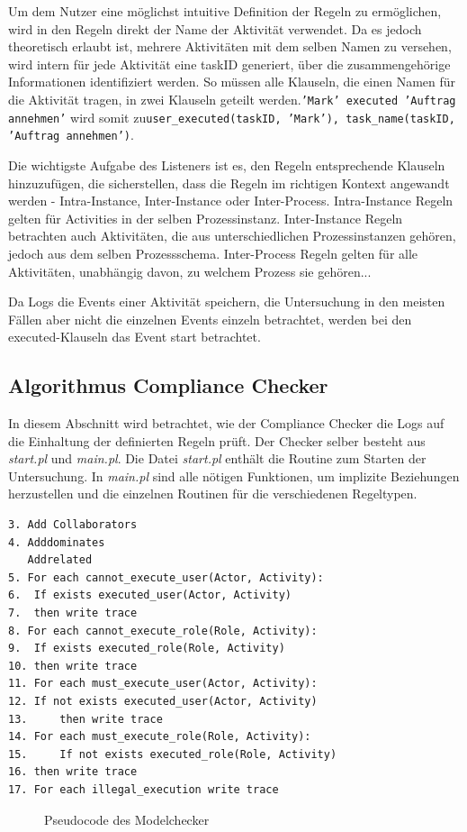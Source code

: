 Um dem Nutzer eine möglichst intuitive Definition der Regeln zu ermöglichen, wird in den Regeln direkt der Name der Aktivität verwendet. Da es jedoch theoretisch erlaubt ist, mehrere Aktivitäten mit dem selben Namen zu versehen, wird intern für jede Aktivität eine taskID generiert, über die zusammengehörige Informationen identifiziert werden. So müssen alle Klauseln, die einen Namen für die Aktivität tragen, in zwei Klauseln geteilt werden.\newline \texttt{'Mark' executed 'Auftrag annehmen'} wird somit zu\newline \texttt{user\_executed(taskID, 'Mark'), task\_name(taskID, 'Auftrag annehmen')}.

Die wichtigste Aufgabe des Listeners ist es, den Regeln entsprechende Klauseln hinzuzufügen, die sicherstellen, dass die Regeln im richtigen Kontext angewandt werden - Intra-Instance, Inter-Instance oder Inter-Process. Intra-Instance Regeln gelten für Activities in der selben Prozessinstanz. Inter-Instance Regeln betrachten auch Aktivitäten, die aus unterschiedlichen Prozessinstanzen gehören, jedoch aus dem selben Prozessschema. Inter-Process Regeln gelten für alle Aktivitäten, unabhängig davon, zu welchem Prozess sie gehören...

Da Logs die Events einer Aktivität speichern, die Untersuchung in den meisten Fällen aber nicht die einzelnen Events einzeln betrachtet, werden bei den executed-Klauseln das Event start betrachtet.

%
%
\subsection{Algorithmus Compliance Checker}
\label{sec:compliancechecker}
In diesem Abschnitt wird betrachtet, wie der Compliance Checker die Logs auf die Einhaltung der definierten Regeln prüft. Der Checker selber besteht aus \textit{start.pl} und \textit{main.pl}. Die Datei \textit{start.pl} enthält die Routine zum Starten der Untersuchung. In \textit{main.pl} sind alle nötigen Funktionen, um implizite Beziehungen herzustellen und die einzelnen Routinen für die verschiedenen Regeltypen.

\begin{verbatim}
3. Add Collaborators
4. Adddominates
   Addrelated
5. For each cannot_execute_user(Actor, Activity): 
6.	If exists executed_user(Actor, Activity) 
7. 	then write trace
8. For each cannot_execute_role(Role, Activity):
9. 	If exists executed_role(Role, Activity)
10.	then write trace
11. For each must_execute_user(Actor, Activity): 
12.	If not exists executed_user(Actor, Activity) 
13. 	then write trace
14. For each must_execute_role(Role, Activity):
15. 	If not exists executed_role(Role, Activity)
16.	then write trace
17. For each illegal_execution write trace
\end{verbatim}
\begin{figure}[!h]
\caption{Pseudocode des Modelchecker}
\label{fig:pseudocode}
\end{figure}

